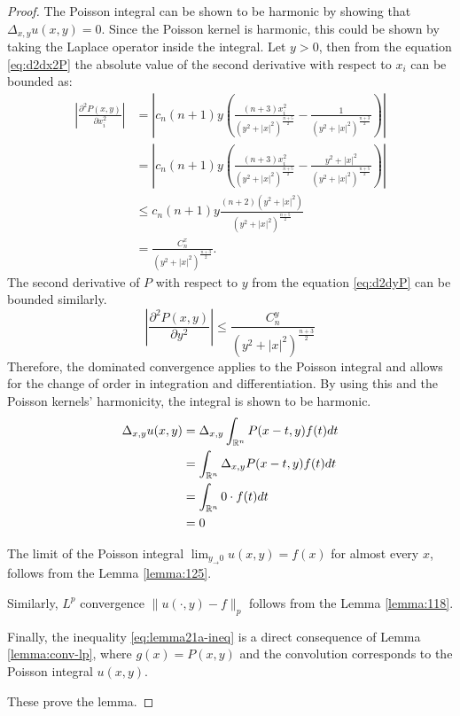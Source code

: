 \begin{proof}
    The Poisson integral can be shown to be harmonic by showing that $\Delta_{x,y} u(x,y)=0$. Since the Poisson kernel is harmonic, this could be shown by taking the Laplace operator inside the integral. Let $y>0$, then from the equation \ref{eq:d2dx2P} the absolute value of the second derivative with respect to $x_i$ can be bounded as:
    \begin{align*}
        \left|\frac{\partial^2P(x,y)}{\partial x_i^2}\right| &=\left|c_n(n+1)y\left( \frac{(n+3)x_i^2}{(y^2+|x|^2)^\frac{n+5}{2}}-\frac{1}{(y^2+|x|^2)^\frac{n+3}{2}}\right)\right| \\
        &= \left|c_n(n+1)y\left( \frac{(n+3)x_i^2}{(y^2+|x|^2)^\frac{n+5}{2}}-\frac{y^2+|x|^2}{(y^2+|x|^2)^\frac{n+5}{2}}\right)\right| \\
        &\leq c_n(n+1)y\frac{(n+2)(y^2+|x|^2)}{(y^2+|x|^2)^\frac{n+5}{2}} \\
        &=\frac{C_n^x}{(y^2+|x|^2)^\frac{n+3}{2}}.
    \end{align*}
    The second derivative of $P$ with respect to $y$ from the equation \ref{eq:d2dyP} can be bounded similarly.
    \begin{equation*}
        \left|\frac{\partial^2P(x,y)}{\partial y^2}\right|\leq \frac{C_n^y}{(y^2+|x|^2)^\frac{n+3}{2}}
    \end{equation*}
    Therefore, the dominated convergence applies to the Poisson integral and allows for the change of order in integration and differentiation. By using this and the Poisson kernels' harmonicity, the integral is shown to be harmonic.
    \begin{align*}
        \Delta_{x,y} u(x,y)&=\Delta_{x,y}\int_{\mathbb R^n} P(x-t,y)f(t)dt \\
        &=\int_{\mathbb R^n} \Delta_{x,y}P(x-t,y)f(t)dt \\
        &=\int_{\mathbb R^n} 0\cdot f(t)dt \\
        &=0
    \end{align*}
    
    The limit of the Poisson integral $\lim_{y_\rightarrow0}u(x,y)=f(x)$ for almost every $x$, follows from the Lemma \ref{lemma:125}.

    Similarly, $L^p$ convergence $\|u(\cdot,y)-f\|_p$ follows from the Lemma \ref{lemma:118}.

    Finally, the inequality \ref{eq:lemma21a-ineq} is a direct consequence of Lemma \ref{lemma:conv-lp}, where $g(x)=P(x,y)$ and the convolution corresponds to the Poisson integral $u(x,y)$.

    These prove the lemma.
\end{proof}

